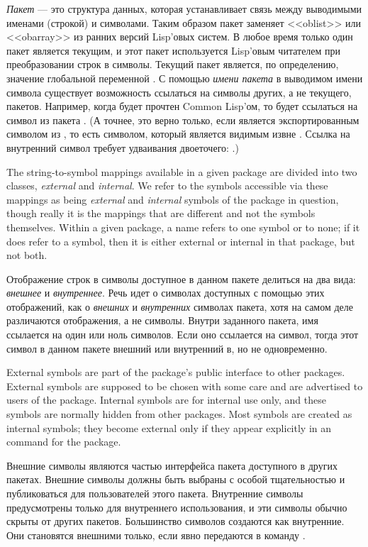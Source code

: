 \emph{Пакет} --- это структура данных, которая устанавливает связь между
выводимыми именами (строкой) и символами. Таким образом пакет заменяет
<<oblist>> или <<obarray>> из ранних версий Lisp'овых систем. В любое время
только один пакет является текущим, и этот пакет используется Lisp'овым
читателем при преобразовании строк в символы. Текущий пакет является, по
определению, значение глобальной переменной . С помощью
\emph{имени пакета} в выводимом имени символа существует возможность
ссылаться на символы других, а не текущего, пакетов.
Например, когда  будет прочтен Common Lisp'ом, то будет ссылаться на
символ  из пакета .
(А точнее, это верно только, если  является экспортированным символом из
, то есть символом, который является видимым извне . Ссылка на
внутренний символ требует удваивания двоеточего: .)

The string-to-symbol mappings available in a given package are divided
into two classes, \emph{external} and \emph{internal}.  We refer to the
symbols accessible via these mappings as being \emph{external} and
\emph{internal} symbols of the package in question, though really it is the
mappings that are different and not the symbols themselves.  Within a
given package, a name refers to one symbol or to none; if it does refer
to a symbol, then it is either external or internal in that
package, but not both.

Отображение строк в символы доступное в данном пакете делиться на два вида:
\emph{внешнее} и \emph{внутреннее}. Речь идет о символах доступных с помощью
этих отображений, как о \emph{внешних} и \emph{внутренних} символах пакета, хотя
на самом деле различаются отображения, а не символы.
Внутри заданного пакета, имя ссылается на один или ноль символов. Если оно
ссылается на символ, тогда этот символ в данном пакете внешний или внутренний в,
но не одновременно. 

External symbols are part of the package's public interface to other
packages.  External symbols are supposed to be chosen with some care and are
advertised to users of the package.  Internal symbols are for internal
use only, and these symbols are normally hidden from other packages.
Most symbols are created as internal symbols; they become external only
if they appear explicitly in an  command for the package.

Внешние символы являются частью интерфейса пакета доступного в других
пакетах. Внешние символы должны быть выбраны с особой тщательностью и
публиковаться для пользователей этого пакета. Внутренние символы
предусмотрены только для внутреннего использования, и эти символы обычно скрыты
от других пакетов. Большинство символов создаются как внутренние. Они становятся
внешними только, если явно передаются в команду .

